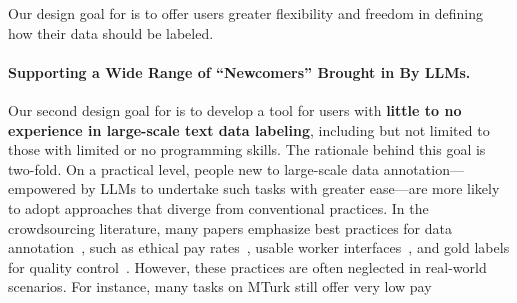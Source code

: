 Our design goal for \system is to offer users greater flexibility and freedom in defining how their data should be labeled.


\paragraph{Supporting a Wide Range of ``Newcomers'' Brought in By LLMs.}
Our second design goal for \system is to develop a tool for users with \textbf{little to no experience in large-scale text data labeling}, including but not limited to those with limited or no programming skills.
The rationale behind this goal is two-fold.
On a practical level, 
people new to large-scale data annotation---empowered by LLMs to undertake such tasks with greater ease---are more likely to adopt approaches that diverge from conventional practices. 
In the crowdsourcing literature, many papers emphasize best practices for data annotation~\cite{hsueh2009data, sabou2014corpus, vondrick2013efficiently, drutsa2019practice, wang2013perspectives}, %
such as ethical pay rates~\cite{fort2011amazon,shmueli2021beyond}, %
usable worker interfaces~\cite{toomim2011utility,10.1145/3613904.3642834, rahmanian2014user, komarov2013crowdsourcing}, %
and 
gold labels for quality control~\cite{han2020crowd,gadiraju2015training,le2010ensuring,doroudi2016toward,hettiachchi2021challenge}. %
However, these practices are often neglected in real-world scenarios. 
For instance, many tasks on MTurk still offer very low pay~\cite{AI_workers_low_wages} %

